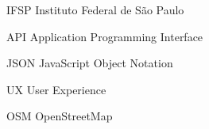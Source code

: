 
\begin{siglas}
    \item[IFSP] Instituto Federal de São Paulo
    \item[API] Application Programming Interface
    \item[JSON] JavaScript Object Notation
    \item[UX] User Experience
    \item[OSM] OpenStreetMap 
\end{siglas}

